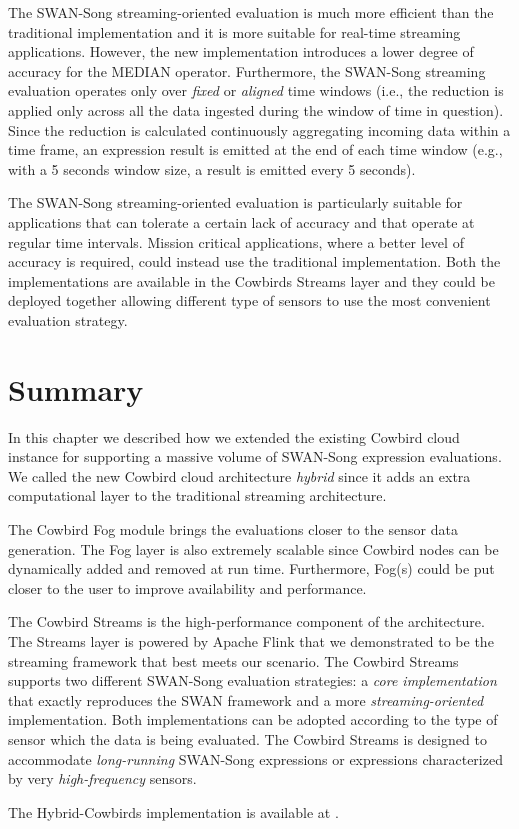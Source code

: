 The SWAN-Song streaming-oriented evaluation is much more efficient than the traditional implementation and it is more suitable for real-time streaming applications. However, the new implementation introduces a lower degree of accuracy for the MEDIAN operator. Furthermore, the SWAN-Song streaming evaluation operates only over \emph{fixed} or \emph{aligned} time windows (i.e., the reduction is applied only across all the data ingested during the window of time in question). Since the reduction is calculated continuously aggregating incoming data within a time frame, an expression result is emitted at the end of each time window (e.g., with a 5 seconds window size, a result is emitted every 5 seconds).

The SWAN-Song streaming-oriented evaluation is particularly suitable for applications that can tolerate a certain lack of accuracy and that operate at regular time intervals. Mission critical applications, where a better level of accuracy is required, could instead use the traditional implementation. Both the implementations are available in the Cowbirds Streams layer and they could be deployed together allowing different type of sensors to use the most convenient evaluation strategy.

\section{Summary}
In this chapter we described how we extended the existing Cowbird cloud instance for supporting a massive volume of SWAN-Song expression evaluations. We called the new Cowbird cloud architecture \emph{hybrid} since it adds an extra computational layer to the traditional streaming architecture.

The Cowbird Fog module brings the evaluations closer to the sensor data generation. The Fog layer is also extremely scalable since Cowbird nodes can be dynamically added and removed at run time. Furthermore, Fog(s) could be put closer to the user to improve availability and performance. 

The Cowbird Streams is the high-performance component of the architecture. The Streams layer is powered by Apache Flink that we demonstrated to be the streaming framework that best meets our scenario. The Cowbird Streams supports two different SWAN-Song evaluation strategies: a \emph{core implementation} that exactly reproduces the SWAN framework and a more \emph{streaming-oriented} implementation. Both implementations can be adopted according to the type of sensor which the data is being evaluated. The Cowbird Streams is designed to accommodate \emph{long-running} SWAN-Song expressions or expressions characterized by very \emph{high-frequency} sensors. 

The Hybrid-Cowbirds implementation is available at \cite{distributedcowbirdsonline}.


